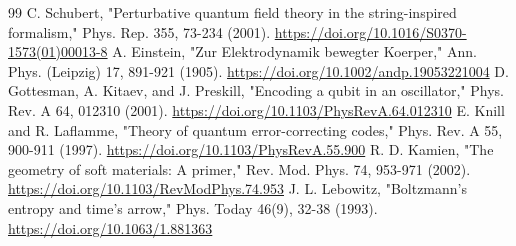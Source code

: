 \documentclass[aip,adv,preprint,floatfix]{revtex4-2}
\begin{document}
\begin{thebibliography}{99}
 C. Schubert, "Perturbative quantum field theory in the string-inspired formalism," Phys. Rep. 355, 73-234 (2001). \url{https://doi.org/10.1016/S0370-1573(01)00013-8}
 A. Einstein, "Zur Elektrodynamik bewegter Koerper," Ann. Phys. (Leipzig) 17, 891-921 (1905). \url{https://doi.org/10.1002/andp.19053221004}
 D. Gottesman, A. Kitaev, and J. Preskill, "Encoding a qubit in an oscillator," Phys. Rev. A 64, 012310 (2001). \url{https://doi.org/10.1103/PhysRevA.64.012310}
 E. Knill and R. Laflamme, "Theory of quantum error-correcting codes," Phys. Rev. A 55, 900-911 (1997). \url{https://doi.org/10.1103/PhysRevA.55.900}
 R. D. Kamien, "The geometry of soft materials: A primer," Rev. Mod. Phys. 74, 953-971 (2002). \url{https://doi.org/10.1103/RevModPhys.74.953}
 J. L. Lebowitz, "Boltzmann's entropy and time's arrow," Phys. Today 46(9), 32-38 (1993). \url{https://doi.org/10.1063/1.881363}
\end{thebibliography}
\end{document}
